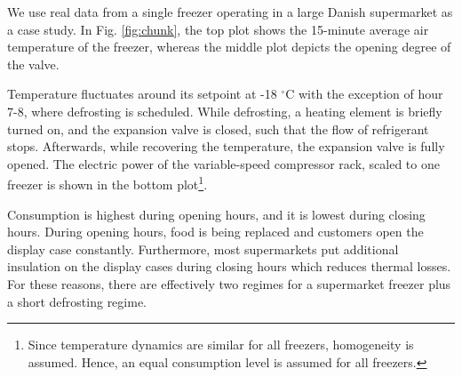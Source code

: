 
We use real data from a single freezer operating in a large Danish supermarket as a case study.
In Fig. \ref{fig:chunk}, the top plot shows the 15-minute average air temperature of the freezer, whereas the middle plot depicts the opening degree of the valve.

Temperature fluctuates around its setpoint at -18 $^{\circ}$C with the exception of hour 7-8, where defrosting is scheduled.
While defrosting, a heating element is briefly turned on, and the expansion valve is closed, such that the flow of refrigerant stops. Afterwards, while recovering the temperature, the expansion valve is fully opened.
The electric power of the variable-speed compressor rack, scaled to one freezer is shown in the bottom plot\footnote{Since temperature dynamics are similar for all freezers, homogeneity is assumed. Hence, an equal consumption level is assumed for all freezers.}.

Consumption is highest during opening hours, and it is lowest during closing hours.
During opening hours, food is being replaced and customers open the display case constantly.
Furthermore, most supermarkets put additional insulation on the display cases during closing hours which reduces thermal losses.
For these reasons, there are effectively two regimes for a supermarket freezer plus a short defrosting regime.

